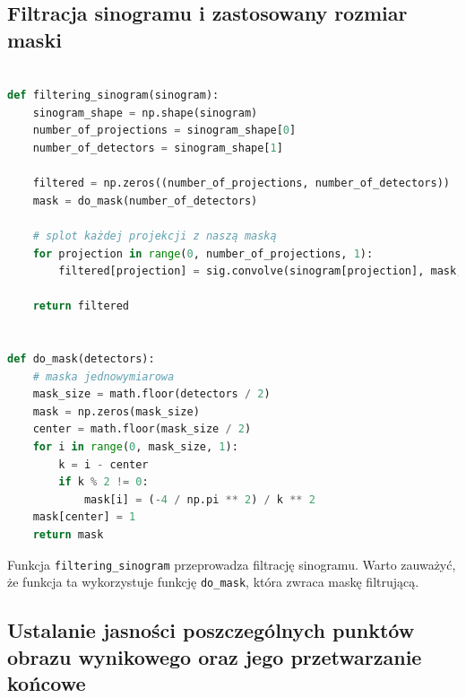 \documentclass[11pt,a4paper]{article}
\begin{document}
    \subsection{Filtracja sinogramu i zastosowany rozmiar maski}
\begin{lstlisting}[language=Python, basicstyle=\normal, breaklines=true]

def filtering_sinogram(sinogram):
    sinogram_shape = np.shape(sinogram)
    number_of_projections = sinogram_shape[0]
    number_of_detectors = sinogram_shape[1]

    filtered = np.zeros((number_of_projections, number_of_detectors))
    mask = do_mask(number_of_detectors)

    # splot każdej projekcji z naszą maską
    for projection in range(0, number_of_projections, 1):
        filtered[projection] = sig.convolve(sinogram[projection], mask, mode='same', method='direct')

    return filtered


def do_mask(detectors):
    # maska jednowymiarowa
    mask_size = math.floor(detectors / 2)
    mask = np.zeros(mask_size)
    center = math.floor(mask_size / 2)
    for i in range(0, mask_size, 1):
        k = i - center
        if k % 2 != 0:
            mask[i] = (-4 / np.pi ** 2) / k ** 2
    mask[center] = 1
    return mask
\end{lstlisting}
    Funkcja \texttt{filtering\_sinogram} przeprowadza filtrację sinogramu.
    Warto zauważyć, że funkcja ta wykorzystuje funkcję \texttt{do\_mask}, która zwraca maskę filtrującą.
    \subsection{Ustalanie jasności poszczególnych punktów obrazu wynikowego oraz jego przetwarzanie końcowe}
\end{document}
